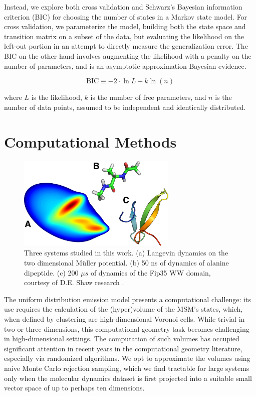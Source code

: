 \documentclass[twocolumn,floatfix,nofootinbib,aps]{revtex4-1}
\begin{document}
Instead, we explore both cross validation and Schwarz's Bayesian information criterion (BIC)\cite{Schwartz78Estimating} for choosing the number of states in a Markov state model. For cross validation, we parameterize the model, building both the state space and transition matrix on a subset of the data, but evaluating the likelihood on the left-out portion in an attempt to directly measure the generalization error. The BIC on the other hand involves augmenting the likelihood with a penalty on the number of parameters, and is
an asymptotic approximation Bayesian evidence.

\begin{equation}
\label{eq:bic}
\mathrm{BIC} \equiv -2\cdot \ln L + k \ln (n)
\end{equation}

where $L$ is the likelihood, $k$ is the number of free parameters, and $n$ is the number of data points, assumed to be independent and identically distributed.

\section{Computational Methods}

\begin{figure}
\centering
\includegraphics[width=3in]{figs/fig1_rbow.png}
\caption{Three systems studied in this work. (a) Langevin dynamics on the two dimensional M\"{u}ller potential. (b) 50 ns of dynamics of alanine dipeptide. (c) 200 $\mu s$ of dynamics of the Fip35 WW domain\cite{Liu2008Experimental}, courtesy of D.E. Shaw research \cite{}.}
\end{figure}

The uniform distribution emission model presents a computational challenge: its use requires the calculation of the (hyper)volume of the MSM's states, which, when defined by clustering are high-dimensional Voronoi cells. While trivial in two or three dimensions, this computational geometry task becomes challenging in high-dimensional settings. The computation of such volumes has occupied significant attention in recent years in the computational geometry literature, especially via randomized algorithms\cite{}. We opt to approximate the volumes using naive Monte Carlo rejection sampling, which we find tractable for large systems only when the molecular dynamics dataset is first projected into a suitable small vector space of up to perhaps ten dimensions.
\end{document}
